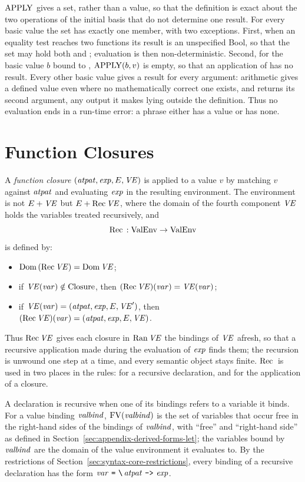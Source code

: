 $\mathrm{APPLY}$ gives a set, rather than a value, so that the definition is exact
about the two operations of the initial basis that do not determine one
result. For every basic value the set has exactly one member, with two
exceptions. First, when an equality test reaches two functions its result is
an unspecified Bool, so that the set may hold both  and ;
evaluation is then non-deterministic. %
Second, for the basic value $b$ bound to , $\mathrm{APPLY}(b,v)$ is
empty, so that an application of  has no result. %
Every other basic value gives a result for every argument: arithmetic gives a
defined value even where no mathematically correct one exists, %
and  returns its second argument, any output it makes lying
outside the definition. %
Thus no evaluation ends in a run-time error: a phrase either has a value or
has none. %

\section{Function Closures}\label{sec:dynamic-core-closures}

A \emph{function closure} $(\mathit{atpat},\mathit{exp},E,\mathit{VE})$ is applied to a value $v$ by
matching $v$ against $\mathit{atpat}$ and evaluating $\mathit{exp}$ in the resulting
environment. The environment is not $E+\mathit{VE}$ but $E+\mathrm{Rec}\,\mathit{VE}$, where the
domain of the fourth component $\mathit{VE}$ holds the variables treated recursively,
and
\[
  \mathrm{Rec}\, : \mathrm{ValEnv}\to\mathrm{ValEnv}
\]
is defined by:
\begin{itemize}
\item $\mathrm{Dom}\,(\mathrm{Rec}\,\mathit{VE})=\mathrm{Dom}\,\mathit{VE}$;
\item if $\mathit{VE}(\mathit{var})\notin\mathrm{Closure}$, then $(\mathrm{Rec}\,\mathit{VE})(\mathit{var})=\mathit{VE}(\mathit{var})$;
\item if $\mathit{VE}(\mathit{var})=(\mathit{atpat},\mathit{exp},E,\mathit{VE}')$, then\\
  $(\mathrm{Rec}\,\mathit{VE})(\mathit{var})=(\mathit{atpat},\mathit{exp},E,\mathit{VE})$.
\end{itemize}
Thus $\mathrm{Rec}\,\mathit{VE}$ gives each closure in $\mathrm{Ran}\,\mathit{VE}$ the bindings of $\mathit{VE}$ afresh,
so that a recursive application made during the evaluation of $\mathit{exp}$ finds
them; the recursion is unwound one step at a time, and every semantic object
stays finite. $\mathrm{Rec}\,$ is used in two places in the rules: for a recursive
declaration, and for the application of a closure.

A declaration is recursive when one of its bindings refers to a variable it
binds. For a value binding $\mathit{valbind}$, $\mathrm{FV}(\mathit{valbind})$ is the set of
variables that occur free in the right-hand sides of the bindings of
$\mathit{valbind}$, with ``free'' and ``right-hand side'' as defined in
Section~\ref{sec:appendix-derived-forms-let}; the variables bound by
$\mathit{valbind}$ are the domain of the value environment it evaluates to. By the
restrictions of Section~\ref{sec:syntax-core-restrictions}, every binding of
a recursive declaration has the form
$\var\ \kw{=}\ \kw{\textbackslash}\,\atpat\ \kw{->}\ \expm$. %

